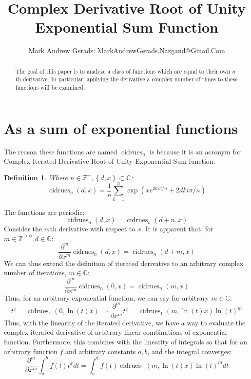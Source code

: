 \documentclass[]{article}
\author{Mark Andrew Gerads: MarkAndrewGerads.Nazgand@Gmail.Com}
\title{Complex Derivative Root of Unity Exponential Sum Function}
\DeclareMathOperator{\cidrues}{cidrues}
\newcommand{\pqty}[1]{{\left(#1\right)}}
\newcommand{\Bqty}[1]{{\left\{#1\right\}}}
\newcommand{\pdiff}[2]{\frac{\partial^{#2}}{\partial #1^{#2}}}
\newtheorem{definition}[theorem]{Definition}
\numberwithin{equation}{section}
\begin{document}
	
	\maketitle
	
	\begin{abstract}
		The goal of this paper is to analyze a class of functions which are equal to their own \(n\)th derivative. In particular, applying the derivative a complex number of times to these functions will be examined.
	\end{abstract}
	
	\section{As a sum of exponential functions}
	The reason these functions are named $\cidrues_n$ is because it is an acronym for Complex Iterated Derivative Root of Unity Exponential Sum function.
	\begin{definition}
		Where $n\in\mathbb{Z}^+,\Bqty{d,x}\subset\mathbb{C}$:
		\begin{equation}
		\label{cidrues Exponential sum form}
		\cidrues_n\pqty{d,x}=
		\frac{1}{n}\sum _{k=1}^n \exp\pqty{xe^{2ki\pi/n}+2dki\pi/n}
		\end{equation}
	\end{definition}
	The functions are periodic:
	\begin{equation}
	\cidrues_n\pqty{d,x}=\cidrues_n\pqty{d+n,x}
	\end{equation}
	Consider the $m$th derivative with respect to $x$. It is apparent that, for $m\in\mathbb{Z}^{\geq 0},d\in\mathbb{C}$:
	\begin{equation}
	\pdiff{x}{m}\cidrues_n\pqty{d,x}=\cidrues_n\pqty{d+m,x}
	\end{equation}
	We can thus extend the definition of iterated derivative to an arbitrary complex number of iterations, $m\in\mathbb{C}$:
	\begin{equation}
	\pdiff{x}{m}\cidrues_n\pqty{0,x}=\cidrues_n\pqty{m,x}
	\end{equation}
	Thus, for an arbitrary exponential function, we can say for arbitrary $m\in\mathbb{C}$:
	\begin{equation}
	t^x=\cidrues_1\pqty{0,\ln\pqty{t}x}
	\Rightarrow
	\pdiff{x}{m}t^x=\cidrues_1\pqty{m,\ln\pqty{t}x}\ln\pqty{t}^m
	\end{equation}
	Thus, with the linearity of the iterated derivative, we have a way to evaluate the complex iterated derivative of arbitrary linear combinations of exponential function. Furthermore, this combines with the linearity of integrals so that for an arbitrary function $f$ and arbitrary constants $a,b$, and the integral converges:
	\begin{equation}
		\pdiff{x}{m}\int_{a}^{b}f\pqty{t}t^x dt = \int_{a}^{b}f\pqty{t}\cidrues_1\pqty{m,\ln\pqty{t}x}\ln\pqty{t}^m dt
	\end{equation}
	
\end{document}
